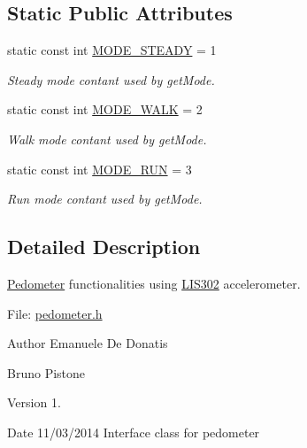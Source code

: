 \subsection*{Static Public Attributes}
\begin{DoxyCompactItemize}
\item 
\hypertarget{class_pedometer_a27aa2aacbeef562588658b858085c930}{static const int \hyperlink{class_pedometer_a27aa2aacbeef562588658b858085c930}{M\-O\-D\-E\-\_\-\-S\-T\-E\-A\-D\-Y} = 1}\label{class_pedometer_a27aa2aacbeef562588658b858085c930}

\begin{DoxyCompactList}\small\item\em Steady mode contant used by get\-Mode. \end{DoxyCompactList}\item 
\hypertarget{class_pedometer_ae30e2fdb9a7d8b1a9b7c3be5b231df97}{static const int \hyperlink{class_pedometer_ae30e2fdb9a7d8b1a9b7c3be5b231df97}{M\-O\-D\-E\-\_\-\-W\-A\-L\-K} = 2}\label{class_pedometer_ae30e2fdb9a7d8b1a9b7c3be5b231df97}

\begin{DoxyCompactList}\small\item\em Walk mode contant used by get\-Mode. \end{DoxyCompactList}\item 
\hypertarget{class_pedometer_a46947e1b0c6ae23f8279047a03b06048}{static const int \hyperlink{class_pedometer_a46947e1b0c6ae23f8279047a03b06048}{M\-O\-D\-E\-\_\-\-R\-U\-N} = 3}\label{class_pedometer_a46947e1b0c6ae23f8279047a03b06048}

\begin{DoxyCompactList}\small\item\em Run mode contant used by get\-Mode. \end{DoxyCompactList}\end{DoxyCompactItemize}


\subsection{Detailed Description}
\hyperlink{class_pedometer}{Pedometer} functionalities using \hyperlink{class_l_i_s302}{L\-I\-S302} accelerometer. 

File\-: \hyperlink{pedometer_8h_source}{pedometer.\-h} \begin{DoxyAuthor}{Author}
Emanuele De Donatis 

Bruno Pistone 
\end{DoxyAuthor}
\begin{DoxyVersion}{Version}
1. 
\end{DoxyVersion}
\begin{DoxyDate}{Date}
11/03/2014 Interface class for pedometer 
\end{DoxyDate}


